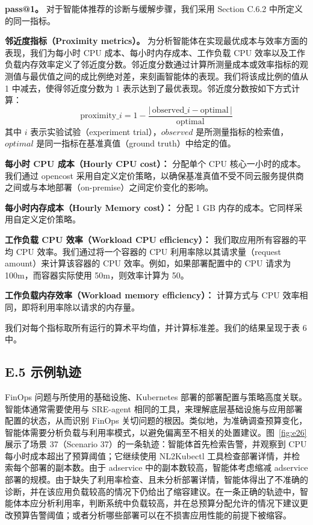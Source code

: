 \documentclass[10pt,UTF8,fontset=fandol]{ctexart}
\begin{document}
\textbf{pass@1。} 对于智能体推荐的诊断与缓解步骤，我们采用 Section C.6.2 中所定义的同一指标。

\textbf{邻近度指标（Proximity metrics）。} 为分析智能体在实现最优成本与效率方面的表现，我们为每小时 CPU 成本、每小时内存成本、工作负载 CPU 效率以及工作负载内存效率定义了邻近度分数。邻近度分数通过计算所测量成本或效率指标的观测值与最优值之间的成比例绝对差，来刻画智能体的表现。我们将该成比例的值从 1 中减去，使得邻近度分数为 1 表示达到了最优表现。邻近度分数按如下方式计算：
\[
\mathrm{proximity}\_i = 1 - \frac{|\,\mathrm{observed}\_i - \mathrm{optimal}\,|}{\mathrm{optimal}}
\]
其中 $i$ 表示实验试验（experiment trial），$observed$ 是所测量指标的检索值，$optimal$ 是同一指标在基准真值（ground truth）中给定的值。

\textbf{每小时 CPU 成本（Hourly CPU cost）：} 分配单个 CPU 核心一小时的成本。我们通过 opencost 采用自定义定价策略，以确保基准真值不受不同云服务提供商之间或与本地部署（on-premise）之间定价变化的影响。

\textbf{每小时内存成本（Hourly Memory cost）：} 分配 1 GB 内存的成本。它同样采用自定义定价策略。

\textbf{工作负载 CPU 效率（Workload CPU efficiency）：} 我们取应用所有容器的平均 CPU 效率。我们通过将一个容器的 CPU 利用率除以其请求量（request amount）来计算该容器的 CPU 效率。例如，如果部署配置中的 CPU 请求为 100m，而容器实际使用 50m，则效率计算为 50。

\textbf{工作负载内存效率（Workload memory efficiency）：} 计算方式与 CPU 效率相同，即将利用率除以请求的内存量。

我们对每个指标取所有运行的算术平均值，并计算标准差。我们的结果呈现于表 6 中。

\subsection{E.5 示例轨迹}

FinOps 问题与所使用的基础设施、Kubernetes 部署的部署配置与策略高度关联。智能体通常需要使用与 SRE-agent 相同的工具，来理解底层基础设施与应用部署配置的状态，从而识别 FinOps 关切问题的根因。类似地，为准确调查预算变化，智能体需要分析负载与利用率模式，以避免偏离至不相关的处置建议。图~\ref{fig:e26} 展示了场景 37（Scenario 37）的一条轨迹：智能体首先检索告警，并观察到 CPU 每小时成本超出了预算阈值；它继续使用 NL2Kubectl 工具检查部署详情，并检索每个部署的副本数。由于 adservice 中的副本数较高，智能体考虑缩减 adservice 部署的规模。由于缺失了利用率检查、且未分析部署详情，智能体得出了不准确的诊断，并在该应用负载较高的情况下仍给出了缩容建议。在一条正确的轨迹中，智能体本应分析利用率，判断系统中负载较高，并在总预算分配允许的情况下建议更改预算告警阈值；或者分析哪些部署可以在不损害应用性能的前提下被缩容。
\end{document}

